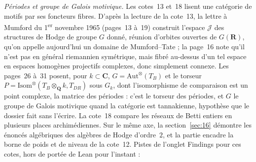 \bigskip
\noindent\emph{Périodes et groupe de Galois motivique.} Les cotes~13 et~18 lisent une catégorie de motifs par ses foncteurs fibres. D'après la lecture de la cote~13, la lettre à Mumford du 1\textsuperscript{er} novembre 1965 (pages~13 à~19) construit l'espace $\mathcal J$ des structures de Hodge de groupe $G$ donné, réunion d'orbites ouvertes de $G(\mathbf R)$, qu'on appelle aujourd'hui un domaine de Mumford--Tate ; la page~16 note qu'il n'est pas en général riemannien symétrique, mais fibré au-dessus d'un tel espace en espaces homogènes projectifs complexes, donc simplement connexe. Les pages~26 à~31 posent, pour $k \subset \mathbf C$, $G = \mathrm{Aut}^\otimes(T_B)$ et le torseur $P = \mathrm{Isom}^\otimes(T_B \otimes_{\mathbf Q} k, T_{DR})$ sous $G_k$, dont l'isomorphisme de comparaison est un point complexe, la matrice des périodes : c'est le torseur des périodes, et $G$ le groupe de Galois motivique quand la catégorie est tannakienne, hypothèse que le dossier fait sans l'écrire. La cote~18 compare les réseaux de Betti entiers en plusieurs places archimédiennes. Sur le même axe, la section~\ref{sec:16} démontre les énoncés algébriques des algèbres de Hodge d'ordre~$2$, et la partie  encadre la borne de poids et de niveau de la cote~12.
\noindent Pistes de l'onglet Findings pour ces cotes, hors de portée de Lean pour l'instant :
